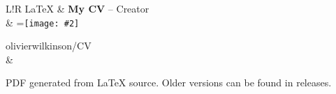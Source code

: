 \documentclass[a4paper,12pt]{article}
\newcommand\VerticalRule{\color{lightgray}\vrule width 0.5pt}
\newcommand{\Icon}[2][0.5cm]{
	\begingroup
	\setbox0=\hbox{\texttt{[image: \#2]}}
	\parbox{\wd0}{\box0}
	\endgroup
}
\begin{document}
\begin{tabular}{L!{\VerticalRule}R}
	LaTeX        & {\bf My CV}  --  Creator                                                           \\
	             & \Icon{github} \hspace{0.1mm} olivierwilkinson/CV                                   \\
	             & \begin{items}
		               \item PDF generated from LaTeX source. Older versions can be found in releases.
	               \end{items}     \\
\end{tabular}
\end{document}
